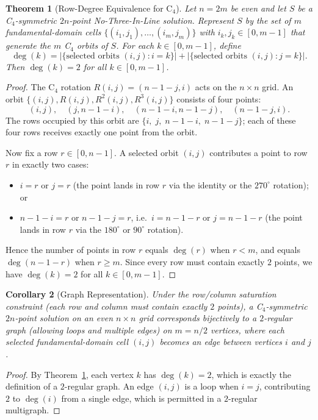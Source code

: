 \documentclass[11pt,a4paper]{article}
\theoremstyle{plain}
\newtheorem{theorem}{Theorem}[section]
\newtheorem{corollary}[theorem]{Corollary}
\theoremstyle{definition}
\begin{document}
\begin{theorem}[Row-Degree Equivalence for C$_4$]
\label{thm:rowdeg}
Let $n=2m$ be even and let $S$ be a C$_4$-symmetric $2n$-point No-Three-In-Line solution. Represent $S$ by the set of $m$ fundamental-domain cells $\{(i_1,j_1),\dots,(i_m,j_m)\}$ with $i_k,j_k\in[0,m-1]$ that generate the $m$ C$_4$ orbits of $S$. For each $k\in[0,m-1]$, define
\[
\deg(k) = \bigl|\{\text{selected orbits }(i,j): i=k\}\bigr| + \bigl|\{\text{selected orbits }(i,j): j=k\}\bigr|.
\]
Then $\deg(k)=2$ for all $k\in[0,m-1]$.
\end{theorem}

\begin{proof}
The C$_4$ rotation $R(i,j) = (n-1-j,i)$ acts on the $n\times n$ grid. An orbit $\{(i,j), R(i,j), R^2(i,j), R^3(i,j)\}$ consists of four points:
\[
(i,j),\quad (j,n-1-i),\quad (n-1-i,n-1-j),\quad (n-1-j,i).
\]
The rows occupied by this orbit are $\{i,\;j,\;n-1-i,\;n-1-j\}$; each of these four rows receives exactly one point from the orbit.

Now fix a row $r\in[0,n-1]$. A selected orbit $(i,j)$ contributes a point to row $r$ in exactly two cases:
\begin{itemize}
\item $i=r$ or $j=r$ (the point lands in row $r$ via the identity or the $270^\circ$ rotation); or
\item $n-1-i=r$ or $n-1-j=r$, i.e.\ $i=n-1-r$ or $j=n-1-r$ (the point lands in row $r$ via the $180^\circ$ or $90^\circ$ rotation).
\end{itemize}
Hence the number of points in row $r$ equals $\deg(r)$ when $r<m$, and equals $\deg(n-1-r)$ when $r\ge m$. Since every row must contain exactly $2$ points, we have $\deg(k)=2$ for all $k\in[0,m-1]$.
\end{proof}

\begin{corollary}[Graph Representation]
\label{cor:c4graph}
Under the row/column saturation constraint (each row and column must contain exactly $2$ points), a C$_4$-symmetric $2n$-point solution on an even $n\times n$ grid corresponds bijectively to a $2$-regular graph (allowing loops and multiple edges) on $m=n/2$ vertices, where each selected fundamental-domain cell $(i,j)$ becomes an edge between vertices $i$ and $j$.
\end{corollary}

\begin{proof}
By Theorem~\ref{thm:rowdeg}, each vertex $k$ has $\deg(k)=2$, which is exactly the definition of a $2$-regular graph. An edge $(i,j)$ is a loop when $i=j$, contributing $2$ to $\deg(i)$ from a single edge, which is permitted in a $2$-regular multigraph.
\end{proof}
\end{document}
